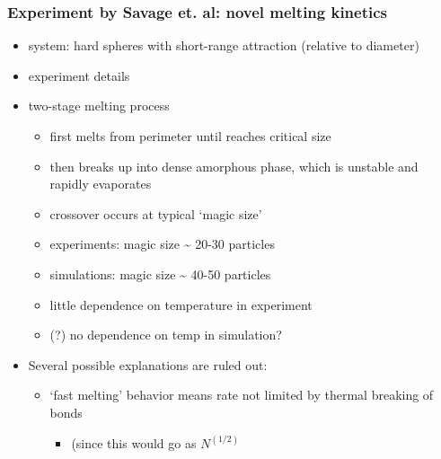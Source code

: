 \documentclass[11pt]{article}
\begin{document}
\subsubsection{Experiment by Savage et. al: novel melting kinetics}
\label{sec-3-1-2}
\begin{itemize}

\item system: hard spheres with short-range attraction (relative to diameter)\\
\label{sec-3-1-2-1}%
\item experiment details\\
\label{sec-3-1-2-2}%
\item two-stage melting process
\label{sec-3-1-2-3}%
\begin{itemize}

\item first melts from perimeter until reaches critical size\\
\label{sec-3-1-2-3-1}%
\item then breaks up into dense amorphous phase, which is unstable and rapidly evaporates\\
\label{sec-3-1-2-3-2}%
\item crossover occurs at typical `magic size'\\
\label{sec-3-1-2-3-3}%
\item experiments: magic size \~{} 20-30 particles\\
\label{sec-3-1-2-3-4}%
\item simulations: magic size \~{} 40-50 particles\\
\label{sec-3-1-2-3-5}%
\item little dependence on temperature in experiment\\
\label{sec-3-1-2-3-6}%
\item (?) no dependence on temp in simulation?\\
\label{sec-3-1-2-3-7}%
\end{itemize} %

\item Several possible explanations are ruled out:
\label{sec-3-1-2-4}%
\begin{itemize}

\item `fast melting' behavior means rate not limited by thermal breaking of bonds
\label{sec-3-1-2-4-1}%
\begin{itemize}

\item (since this would go as $N^(1/2)$\\
\label{sec-3-1-2-4-1-1}%
\end{itemize} %


\end{itemize}
\end{itemize}
\end{document}
